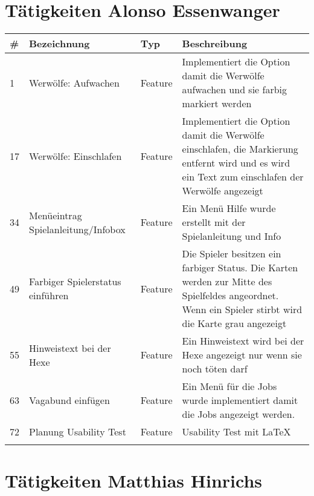 \newpage
\section{Tätigkeiten Alonso Essenwanger}

\begin{tabularx}{\textwidth}{|l|p{4.5cm}|l|X|}
	\hline                                              %
	\textbf{\#}  &    \textbf{Bezeichnung}  &    \textbf{Typ}  & \textbf{Beschreibung}	 \\ 
	\hline \hline 
	\endhead    
	
	1 \label{iss:1}	&	Werwölfe: Aufwachen	&	Feature	&	Implementiert die Option damit die Werwölfe aufwachen und sie farbig markiert werden  \\ \hline
	17 \label{iss:17}	&	Werwölfe: Einschlafen &	Feature	&	Implementiert die Option damit die Werwölfe einschlafen, die Markierung entfernt wird und es wird ein Text zum einschlafen der Werwölfe angezeigt  \\ \hline
	34 \label{iss:34}	&	Menüeintrag Spielanleitung/Infobox	&	Feature	&	Ein Menü Hilfe wurde erstellt mit der Spielanleitung und Info   \\ \hline
	49 \label{iss:49}	&	Farbiger Spielerstatus einführen 	&	Feature	&	Die Spieler besitzen ein farbiger Status. Die Karten werden zur Mitte des Spielfeldes angeordnet. Wenn ein Spieler stirbt wird die Karte grau angezeigt  \\ \hline
	55 \label{iss:55}	&	Hinweistext bei der Hexe	 &	Feature	&	Ein Hinweistext wird bei der Hexe angezeigt nur wenn sie noch töten darf  \\ \hline
	63 \label{iss:63-1}	&	Vagabund einfügen	&	Feature	&	Ein Menü für die Jobs wurde implementiert damit die Jobs angezeigt werden.  \\ \hline
	72 \label{iss:72}	&	Planung Usability Test	&	Feature	&	Usability Test mit LaTeX  \\ \hline
\caption{Tätigkeiten Alonso Essenwanger}\label{tbl:alonso}
\end{tabularx}

\newpage
\section{Tätigkeiten Matthias Hinrichs}

